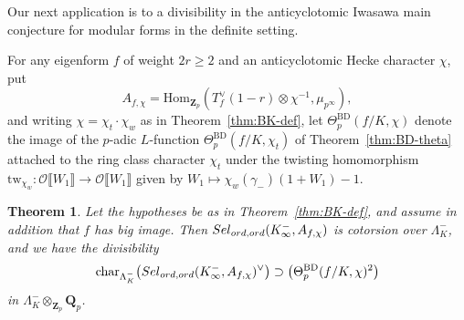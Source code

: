 \documentclass[10pt,letterpaper]{amsart}
\theoremstyle{plain}
\newtheorem{thm}{Theorem}[subsection] %
\theoremstyle{definition}
\theoremstyle{definition}
\theoremstyle{plain}
\theoremstyle{plain}
\theoremstyle{plain}
\theoremstyle{remark}
\numberwithin{equation}{section}
\newcommand{\Sel}{Sel}
\newcommand{\ord}{{{\rm ord},{\rm ord}}}
\DeclareMathOperator{\BD}{BD} %
\def\cO{\mathcal O}
\newcommand{\Q}{\mathbf{Q}}
\newcommand{\Z}{\mathbf{Z}}
\def\Sel{{\rm Sel}}
\newcommand{\dBr}[1]{\llbracket{#1}\rrbracket}
\begin{document}
Our next application is to a divisibility in the anticyclotomic Iwasawa main conjecture for modular forms in the definite setting. 

For any eigenform $f$ of weight $2r\geq 2$ and an anticyclotomic Hecke character $\chi$,
put 
\[
A_{f,\chi}={\mathrm{Hom}}_{\Z_p}(T_f^\vee(1-r)\otimes\chi^{-1},\mu_{p^\infty}),
\]
and writing $\chi=\chi_t\cdot\chi_w$ as in Theorem~\ref{thm:BK-def}, let $\Theta_p^{\BD}(f/K,\chi)$ denote the image of the $p$-adic $L$-function $\Theta_p^{\BD}(f/K,\chi_t)$ of Theorem~\ref{thm:BD-theta} attached to the ring class character $\chi_t$ under the twisting homomorphism
${\mathrm{tw}}_{\chi_w}:\cO\dBr{W_1}\rightarrow\cO\dBr{W_1}$ given by $W_1\mapsto\chi_w(\gamma_-)(1+W_1)-1$. 

\begin{thm}\label{thm:IMC-def}
Let the hypotheses be as in Theorem~\ref{thm:BK-def}, and assume in addition that $f$ has big image. 
Then $\Sel_{\ord}(K_\infty^-,A_{f,\chi})$ is cotorsion over $\Lambda_K^-$, and we have the divisibility
\[
{\mathrm{char}}_{\Lambda_K^-}\bigl(\Sel_{\ord}(K_\infty^-,A_{f,\chi})^\vee\bigr)\supset\bigl(\Theta_p^{\BD}(f/K,\chi)^2\bigr)
\]
in $\Lambda_K^-\otimes_{\Z_p}\Q_p$.
\end{thm}
\end{document}
